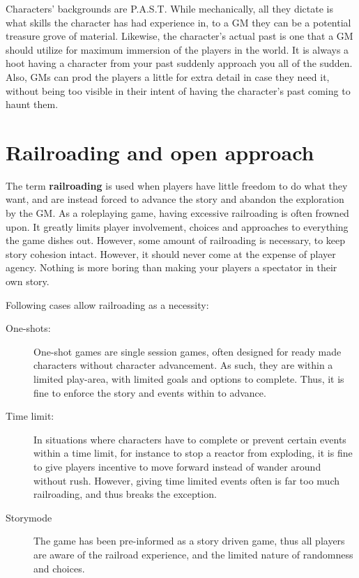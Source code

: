 \documentclass[11pt,a4paper,twocolumn]{book}
\begin{document}
    Characters' backgrounds are P.A.S.T. While mechanically, all they dictate is what skills the character has had experience in, to a GM they can be a potential treasure grove of material. Likewise, the character's actual past is one that a GM should utilize for maximum immersion of the players in the world. It is always a hoot having a character from your past suddenly approach you all of the sudden. Also, GMs can prod the players a little for extra detail in case they need it, without being too visible in their intent of having the character's past coming to haunt them.
    
    \section*{Railroading and open approach}
    The term \textbf{railroading} is used when players have little freedom to do what they want, and are instead forced to advance the story and abandon the exploration by the GM. As a roleplaying game, having excessive railroading is often frowned upon. It greatly limits player involvement, choices and approaches to everything the game dishes out. However, some amount of railroading is necessary, to keep story cohesion intact. However, it should never come at the expense of player agency. Nothing is more boring than making your players a spectator in their own story.
    
    Following cases allow railroading as a necessity:
    \begin{description}
        \item[One-shots:] One-shot games are single session games, often designed for ready made characters without character advancement. As such, they are within a limited play-area, with limited goals and options to complete. Thus, it is fine to enforce the story and events within to advance.
        \item[Time limit:] In situations where characters have to complete or prevent certain events within a time limit, for instance to stop a reactor from exploding, it is fine to give players incentive to move forward instead of wander around without rush. However, giving time limited events often is far too much railroading, and thus breaks the exception. 
        \item[Storymode] The game has been pre-informed as a story driven game, thus all players are aware of the railroad experience, and the limited nature of randomness and choices.
    \end{description}
    
\end{document}
